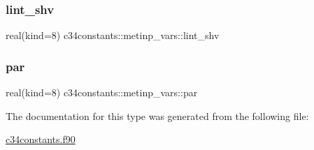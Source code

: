 \subsubsection{\texorpdfstring{lint\+\_\+shv}{lint\_shv}}
{\footnotesize\ttfamily real(kind=8) c34constants\+::metinp\+\_\+vars\+::lint\+\_\+shv}

\mbox{\label{structc34constants_1_1metinp__vars_a5d75984acca70974ff8c6bd53628f1d0}} 
\subsubsection{\texorpdfstring{par}{par}}
{\footnotesize\ttfamily real(kind=8) c34constants\+::metinp\+\_\+vars\+::par}



The documentation for this type was generated from the following file\+:\begin{DoxyCompactItemize}
\item 
\hyperlink{c34constants_8f90}{c34constants.\+f90}\end{DoxyCompactItemize}
